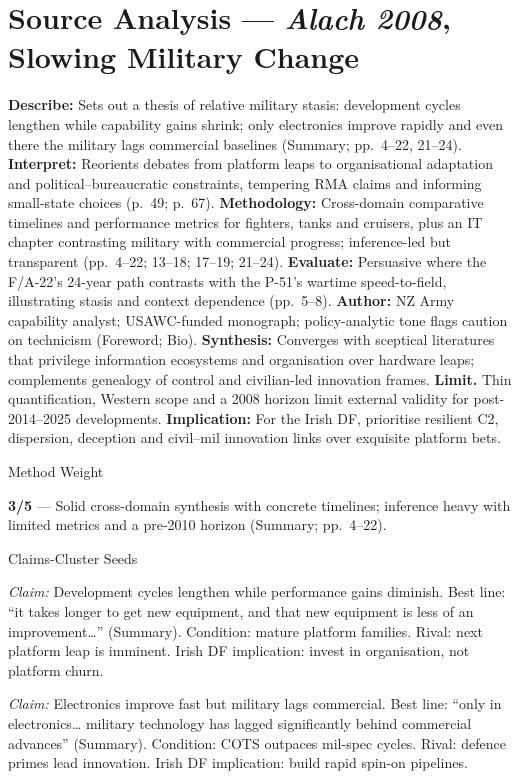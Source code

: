 \section*{Source Analysis — \textit{Alach 2008}, Slowing Military Change}
\textbf{Describe:} Sets out a thesis of relative military stasis: development cycles lengthen while capability gains shrink; only electronics improve rapidly and even there the military lags commercial baselines (Summary; pp.~4–22, 21–24).
\textbf{Interpret:} Reorients debates from platform leaps to organisational adaptation and political–bureaucratic constraints, tempering RMA claims and informing small-state choices (p.~49; p.~67).
\textbf{Methodology:} Cross-domain comparative timelines and performance metrics for fighters, tanks and cruisers, plus an IT chapter contrasting military with commercial progress; inference-led but transparent (pp.~4–22; 13–18; 17–19; 21–24).
\textbf{Evaluate:} Persuasive where the F/A-22’s 24-year path contrasts with the P-51’s wartime speed-to-field, illustrating stasis and context dependence (pp.~5–8).
\textbf{Author:} NZ Army capability analyst; USAWC-funded monograph; policy-analytic tone flags caution on technicism (Foreword; Bio).
\textbf{Synthesis:} Converges with sceptical literatures that privilege information ecosystems and organisation over hardware leaps; complements genealogy of control and civilian-led innovation frames.
\textbf{Limit.} Thin quantification, Western scope and a 2008 horizon limit external validity for post-2014–2025 developments.
\textbf{Implication:} For the Irish DF, prioritise resilient C2, dispersion, deception and civil–mil innovation links over exquisite platform bets.

Method Weight

\textbf{3/5} — Solid cross-domain synthesis with concrete timelines; inference heavy with limited metrics and a pre-2010 horizon (Summary; pp.~4–22).

Claims-Cluster Seeds

\textit{Claim:} Development cycles lengthen while performance gains diminish.
Best line: “it takes longer to get new equipment, and that new equipment is less of an improvement…” (Summary). Condition: mature platform families. Rival: next platform leap is imminent. Irish DF implication: invest in organisation, not platform churn.

\textit{Claim:} Electronics improve fast but military lags commercial.
Best line: “only in electronics… military technology has lagged significantly behind commercial advances” (Summary). Condition: COTS outpaces mil-spec cycles. Rival: defence primes lead innovation. Irish DF implication: build rapid spin-on pipelines.

